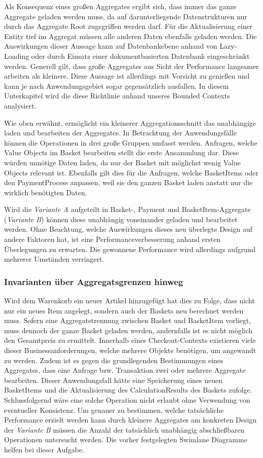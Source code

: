 Als Konsequenz eines großen Aggregates ergibt sich, dass immer das ganze Aggregate geladen werden muss, da auf darunterliegende Datenstrukturen nur durch das Aggregate Root zugegriffen werden darf. Für die Aktualisierung einer Entity tief im Aggregat müssen alle anderen Daten ebenfalls geladen werden. Die Auswirkungen dieser Aussage kann auf Datenbankebene anhand von Lazy-Loading oder durch Einsatz einer dokumentbasierten Datenbank eingeschränkt werden. Generell gilt, dass große Aggregates aus Sicht der Performance langsamer arbeiten als kleinere. Diese Aussage ist allerdings mit Vorsicht zu genießen und kann je nach Anwendungsgebiet sogar gegensätzlich ausfallen. In diesem Unterkapitel wird die diese Richtlinie anhand unseres Bounded Contexts analysiert.

Wie oben erwähnt, ermöglicht ein kleinerer Aggregationsschnitt das unabhängige laden und bearbeiten der Aggregates. In Betrachtung der Anwendungsfälle können die Operationen in drei große Gruppen umfasst werden. Anfragen, welche Value Objects im Basket bearbeiten stellt die erste Ansammlung dar. Diese würden unnötige Daten laden, da nur der Basket mit möglichst wenig Value Objects relevant ist. Ebenfalls gilt dies für die Anfragen, welche BasketItems oder den PaymentProcess anpassen, weil sie den ganzen Basket laden anstatt nur die wirklich benötigten Daten.

Wird die \emph{Variante A} aufgeteilt in Basket-, Payment und BasketItem-Aggregate (\emph{Variante B}) können diese unabhängig voneinander geladen und bearbeitet werden. Ohne Beachtung, welche Auswirkungen dieses neu überlegte Design auf andere Faktoren hat, ist eine Performanceverbesserung anhand ersten Überlegungen zu erwarten. Die gewonnene Performance wird allerdings aufgrund mehrerer Umständen verringert.

\subsubsection{Invarianten über Aggregatsgrenzen hinweg}

Wird dem Warenkorb ein neuer Artikel hinzugefügt hat dies zu Folge, dass nicht nur ein neues Item angelegt, sondern auch der Baskets neu berechnet werden muss. Sofern eine Aggregatstrennung zwischen Basket und BasketItem vorliegt, muss dennoch der ganze Basket geladen werden, andernfalls ist es nicht möglich den Gesamtpreis zu ermittelt. Innerhalb eines Checkout-Contexts existieren viele dieser Businessanforderungen, welche mehrere Objekte benötigen, um angewandt zu werden. Zudem ist es gegen die grundlegenden Bestimmungen eines Aggregates, dass eine Anfrage bzw. Transaktion zwei oder mehrere Aggregate bearbeiten. Dieser Anwendungsfall hätte eine Speicherung eines neuen BasketItems und die Aktualisierung des CalculationResults des Baskets zufolge. Schlussfolgernd wäre eine solche Operation nicht erlaubt ohne Verwendung von eventueller Konsistenz. Um genauer zu bestimmen, welche tatsächliche Performance erzielt werden kann durch kleinere Aggregates am konkreten Design der \emph{Variante B} müssen die Anzahl der tatsächlich unabhängig abschließbaren Operationen untersucht werden. Die vorher festgelegten Swimlane Diagramme helfen bei dieser Aufgabe.

